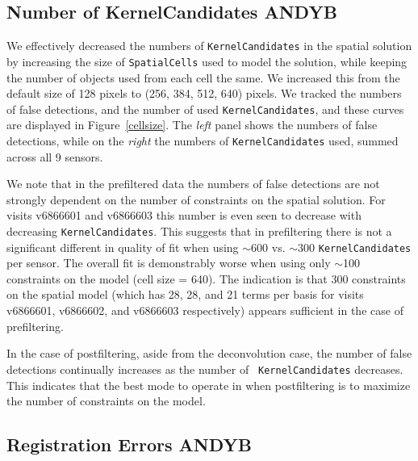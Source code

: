 \documentclass[prd, nofootinbib, floatfix, 11pt,tightenlines,times]{article}
\begin{document}

\subsection{Number of KernelCandidates {\bf ANDYB}}

We effectively decreased the numbers of {\tt KernelCandidates} in the
spatial solution by increasing the size of {\tt SpatialCells} used to
model the solution, while keeping the number of objects used from each
cell the same.  We increased this from the default size of 128 pixels
to (256, 384, 512, 640) pixels.  We tracked the numbers of false
detections, and the number of used {\tt KernelCandidates}, and these
curves are displayed in Figure~\ref{cellsize}.  The {\it left} panel
shows the numbers of false detections, while on the {\it right} the
numbers of {\tt KernelCandidates} used, summed across all 9 sensors.

We note that in the prefiltered data the numbers of false detections
are not strongly dependent on the number of constraints on the spatial
solution.  For visits v6866601 and v6866603 this number is even seen
to decrease with decreasing {\tt KernelCandidates}.  This suggests
that in prefiltering there is not a significant different in quality
of fit when using $\sim$600 vs. $\sim$300 {\tt KernelCandidates} per
sensor.  The overall fit is demonstrably worse when using only
$\sim$100 constraints on the model (cell size = 640).  The indication
is that 300 constraints on the spatial model (which has 28, 28, and 21
terms per basis for visits v6866601, v6866602, and v6866603
respectively) appears sufficient in the case of prefiltering.

In the case of postfiltering, aside from the deconvolution case, the
number of false detections continually increases as the number of {\tt
  KernelCandidates} decreases.  This indicates that the best mode to
operate in when postfiltering is to maximize the number of constraints
on the model.

\subsection{Registration Errors {\bf ANDYB}}
\end{document}
